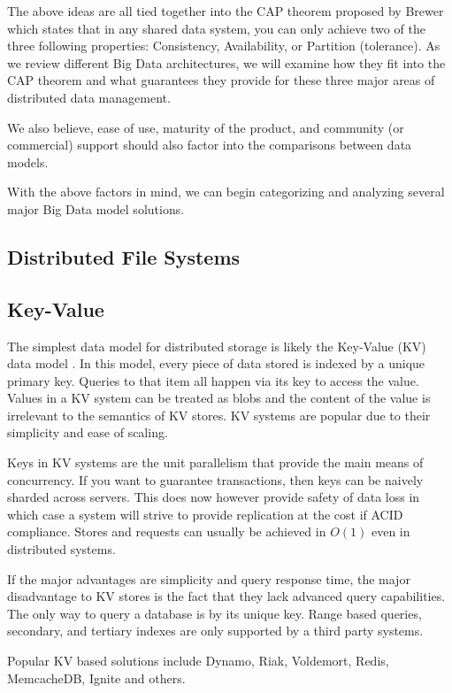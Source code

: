 \documentclass[]{article}
\begin{document}
The above ideas are all tied together into the CAP theorem proposed by Brewer\cite{brewer2000towards} which states that in any shared data system, you can only achieve two of the three following properties: Consistency, Availability, or Partition (tolerance). As we review different Big Data architectures, we will examine how they fit into the CAP theorem and what guarantees they provide for these three major areas of distributed data management.

We also believe, ease of use, maturity of the product, and community (or commercial) support should also factor into the comparisons between data models. 

With the above factors in mind, we can begin categorizing and analyzing several major Big Data model solutions.


\subsection{Distributed File Systems}

\subsection{Key-Value}
The simplest data model for distributed storage is likely the Key-Value (KV) data model \cite{weber_nosql_2010}. In this model, every piece of data stored is indexed by a unique primary key. Queries to that item all happen via its key to access the value. Values in a KV system can be treated as blobs and the content of the value is irrelevant to the semantics of KV stores. KV systems are popular due to their simplicity and ease of scaling.

Keys in KV systems are the unit parallelism that provide the main means of concurrency. If you want to guarantee transactions, then keys can be naively sharded across servers. This does now however provide safety of data loss in which case a system will strive to provide replication at the cost if ACID compliance. Stores and requests can usually be achieved in $O(1)$ even in distributed systems\cite{ravendb}.

If the major advantages are simplicity and query response time\cite{chen_big_2014}, the major disadvantage to KV stores is the fact that they lack advanced query capabilities. The only way to query a database is by its unique key. Range based queries, secondary, and tertiary indexes are only supported by a third party systems.

Popular KV based solutions include Dynamo, Riak, Voldemort, Redis, MemcacheDB, Ignite and others.
\end{document}
